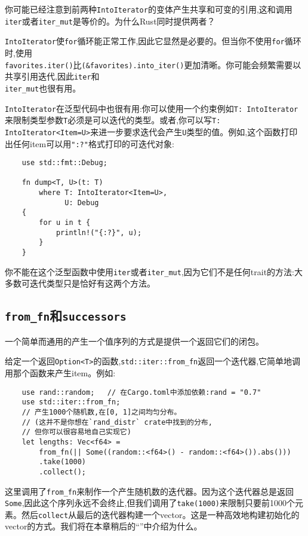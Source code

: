 你可能已经注意到前两种\texttt{IntoIterator}的变体产生共享和可变的引用,这和调用\texttt{iter}或者\texttt{iter\_mut}是等价的。为什么Rust同时提供两者？

\texttt{IntoIterator}使\texttt{for}循环能正常工作,因此它显然是必要的。但当你不使用\texttt{for}循环时,使用\\
\texttt{favorites.iter()}比\texttt{(\&favorites).into\_iter()}更加清晰。你可能会频繁需要以共享引用迭代,因此\texttt{iter}和\\
\texttt{iter\_mut}也很有用。

\texttt{IntoIterator}在泛型代码中也很有用:你可以使用一个约束例如\texttt{T: IntoIterator}来限制类型参数\texttt{T}必须是可以迭代的类型。或者,你可以写\texttt{T: IntoIterator<Item=U>}来进一步要求迭代会产生\texttt{U}类型的值。例如,这个函数打印出任何item可以用\texttt{"{:?}"}格式打印的可迭代对象:
\begin{verbatim}
    use std::fmt::Debug;

    fn dump<T, U>(t: T)
        where T: IntoIterator<Item=U>,
              U: Debug
    {
        for u in t {
            println!("{:?}", u);
        }
    }
\end{verbatim}
你不能在这个泛型函数中使用\texttt{iter}或者\texttt{iter\_mut},因为它们不是任何trait的方法:大多数可迭代类型只是恰好有这两个方法。

\subsection{\texttt{from\_fn}和\texttt{successors}}

一个简单而通用的产生一个值序列的方式是提供一个返回它们的闭包。

给定一个返回\texttt{Option<T>}的函数,\texttt{std::iter::from\_fn}返回一个迭代器,它简单地调用那个函数来产生item。例如:
\begin{verbatim}
    use rand::random;   // 在Cargo.toml中添加依赖:rand = "0.7"
    use std::iter::from_fn;
    // 产生1000个随机数,在[0, 1]之间均匀分布。
    // (这并不是你想在`rand_distr` crate中找到的分布,
    // 但你可以很容易地自己实现它)
    let lengths: Vec<f64> =
        from_fn(|| Some((random::<f64>() - random::<f64>()).abs()))
        .take(1000)
        .collect();
\end{verbatim}

这里调用了\texttt{from\_fn}来制作一个产生随机数的迭代器。因为这个迭代器总是返回\texttt{Some},因此这个序列永远不会终止,但我们调用了\texttt{take(1000)}来限制只要前1000个元素。然后\texttt{collect}从最后的迭代器构建一个vector。这是一种高效地构建初始化的vector的方式。我们将在本章稍后的“”中介绍为什么。

